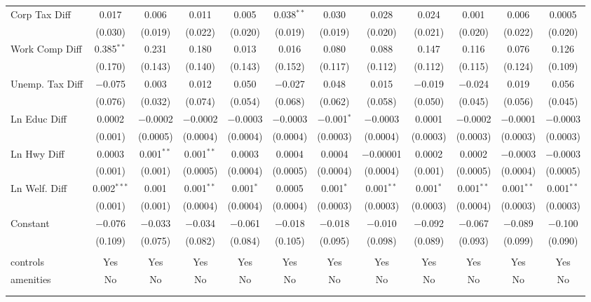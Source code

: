 \begin{table}[!htbp]
\begin{tabular}{@{\extracolsep{5pt}}lccccccccccc}
  Corp Tax Diff & 0.017 & 0.006 & 0.011 & 0.005 & 0.038$^{**}$ & 0.030 & 0.028 & 0.024 & 0.001 & 0.006 & 0.0005 \\ 
  & (0.030) & (0.019) & (0.022) & (0.020) & (0.019) & (0.019) & (0.020) & (0.021) & (0.020) & (0.022) & (0.020) \\ 
  Work Comp Diff & 0.385$^{**}$ & 0.231 & 0.180 & 0.013 & 0.016 & 0.080 & 0.088 & 0.147 & 0.116 & 0.076 & 0.126 \\ 
  & (0.170) & (0.143) & (0.140) & (0.143) & (0.152) & (0.117) & (0.112) & (0.112) & (0.115) & (0.124) & (0.109) \\ 
  Unemp. Tax Diff & $-$0.075 & 0.003 & 0.012 & 0.050 & $-$0.027 & 0.048 & 0.015 & $-$0.019 & $-$0.024 & 0.019 & 0.056 \\ 
  & (0.076) & (0.032) & (0.074) & (0.054) & (0.068) & (0.062) & (0.058) & (0.050) & (0.045) & (0.056) & (0.045) \\ 
  Ln Educ Diff & 0.0002 & $-$0.0002 & $-$0.0002 & $-$0.0003 & $-$0.0003 & $-$0.001$^{*}$ & $-$0.0003 & 0.0001 & $-$0.0002 & $-$0.0001 & $-$0.0003 \\ 
  & (0.001) & (0.0005) & (0.0004) & (0.0004) & (0.0004) & (0.0003) & (0.0004) & (0.0003) & (0.0003) & (0.0003) & (0.0003) \\ 
  Ln Hwy Diff & 0.0003 & 0.001$^{**}$ & 0.001$^{**}$ & 0.0003 & 0.0004 & 0.0004 & $-$0.00001 & 0.0002 & 0.0002 & $-$0.0003 & $-$0.0003 \\ 
  & (0.001) & (0.001) & (0.0005) & (0.0004) & (0.0005) & (0.0004) & (0.0004) & (0.001) & (0.0005) & (0.0004) & (0.0005) \\ 
  Ln Welf. Diff & 0.002$^{***}$ & 0.001 & 0.001$^{**}$ & 0.001$^{*}$ & 0.0005 & 0.001$^{*}$ & 0.001$^{**}$ & 0.001$^{*}$ & 0.001$^{**}$ & 0.001$^{**}$ & 0.001$^{**}$ \\ 
  & (0.001) & (0.001) & (0.0004) & (0.0004) & (0.0004) & (0.0003) & (0.0003) & (0.0003) & (0.0004) & (0.0003) & (0.0003) \\ 
  Constant & $-$0.076 & $-$0.033 & $-$0.034 & $-$0.061 & $-$0.018 & $-$0.018 & $-$0.010 & $-$0.092 & $-$0.067 & $-$0.089 & $-$0.100 \\ 
  & (0.109) & (0.075) & (0.082) & (0.084) & (0.105) & (0.095) & (0.098) & (0.089) & (0.093) & (0.099) & (0.090) \\ 
 \hline \\[-1.8ex] 
controls & Yes & Yes & Yes & Yes & Yes & Yes & Yes & Yes & Yes & Yes & Yes \\ 
amenities & No & No & No & No & No & No & No & No & No & No & No \\ 
\hline \\[-1.8ex] 
\hline 
\hline \\[-1.8ex] 
\end{tabular} 
\end{table} 
